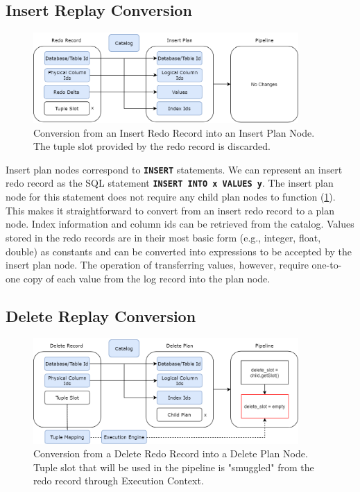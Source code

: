 \documentclass[12pt]{cmuthesis}
\newcommand{\dbSQL}[1]{\texttt{\textbf{#1}}\xspace}
\begin{document}
\subsection{Insert Replay Conversion}

\begin{figure}[t!]
\centering
\includegraphics[width=0.9\textwidth]{images/InsertConversion.png}
\caption{Conversion from an Insert Redo Record into an Insert Plan Node. The tuple slot provided by the redo record is discarded.}
\label{fig:insert_conversion}
\end{figure}
Insert plan nodes correspond to \dbSQL{INSERT} statements. We can represent an insert redo record as the SQL statement \dbSQL{INSERT INTO x VALUES y}. The insert plan node for this statement does not require any child plan nodes to function (\cref{fig:insert_conversion}). This makes it straightforward to convert from an insert redo record to a plan node. Index information and column ids can be retrieved from the catalog. Values stored in the redo records are in their most basic form (e.g., integer, float, double) as constants and can be converted into expressions to be accepted by the insert plan node. The operation of transferring values, however, require one-to-one copy of each value from the log record into the plan node. 

\subsection{Delete Replay Conversion}
\begin{figure}[t!]
\centering
\includegraphics[width=0.9\textwidth]{images/DeleteConversion.png}
\caption{Conversion from a Delete Redo Record into a Delete Plan Node. Tuple slot that will be used in the pipeline is "smuggled" from the redo record through Execution Context.}
\label{fig:delete_conversion}
\end{figure}
\end{document}
